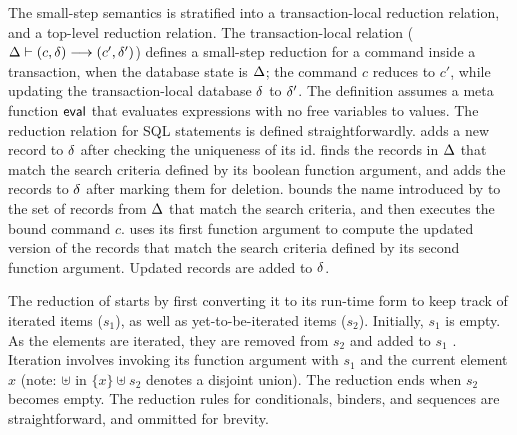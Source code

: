 The small-step semantics is stratified into a transaction-local
reduction relation, and a top-level reduction relation. The
transaction-local relation ($\Delta \vdash (c,\delta) \longrightarrow
(c',\delta')$) defines a small-step reduction for a command inside a
transaction, when the database state is $\Delta$; the command $c$
reduces to $c'$, while updating the transaction-local database $\delta$
to $\delta'$. The definition assumes a meta function $\textsf{eval}$ that
evaluates expressions with no free variables to values. The reduction
relation for SQL statements is defined straightforwardly. 
adds a new record to $\delta$ after checking the uniqueness of its
id.  finds the records in $\Delta$ that match the search
criteria defined by its boolean function argument, and adds the
records to $\delta$ after marking them for deletion.  bounds
the name introduced by  to the set of records from $\Delta$ that
match the search criteria, and then executes the bound command
$c$.  uses its first function argument to compute the
updated version of the records that match the search criteria defined
by its second function argument. Updated records are added to $\delta$.

The reduction of  starts by first converting it to its
run-time form to keep track of iterated items ($s_1$),
as well as  yet-to-be-iterated items ($s_2$). Initially, $s_1$ is
empty. As the elements are iterated, they are removed from $s_2$ and
added to $s_1$ . Iteration involves invoking its function argument
with $s_1$ and the current element $x$ (note: $\uplus$ in $\{x\}
\uplus s_2$ denotes a disjoint union). The reduction ends when 
$s_2$ becomes empty. The reduction rules for conditionals, 
binders, and sequences are straightforward, and ommitted for brevity.

